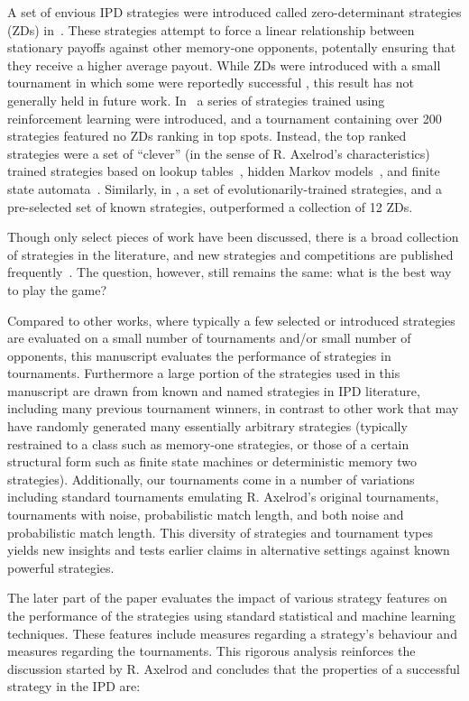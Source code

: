 \documentclass{article}
\newcommand{\numberofalltournaments}{}
\newcommand{\numberofstrategies}{}
\begin{document}
A set of envious IPD strategies were introduced called zero-determinant strategies (ZDs)
in~\cite{Press2012}. These strategies attempt to force a linear relationship between
stationary payoffs against other memory-one opponents, potentally ensuring that they
receive a higher average payout. While ZDs were introduced with a small tournament in
which some were reportedly successful \cite{Stewart2012}, this result has not generally
held in future work. In~\cite{Harper2017} a series of strategies trained using
reinforcement learning were introduced, and a tournament containing over 200 strategies
featured no ZDs ranking in top spots. Instead, the top ranked strategies
were a set of ``clever'' (in the sense of R. Axelrod's characteristics) trained
strategies based on lookup tables~\cite{Axelrod1987}, hidden Markov
models~\cite{Harper2017}, and finite state automata~\cite{Miller1996}.
Similarly, in \cite{mathieu2017}, a set of evolutionarily-trained strategies,
and a pre-selected set of known strategies, outperformed a collection of 12 ZDs.

Though only select pieces of work have been discussed, there is a broad collection
of strategies in the literature, and new strategies and competitions are
published frequently~\cite{Glynatsi2019}. The question, however, still remains
the same: what is the best way to play the game?

Compared to other works, where typically a few selected or introduced strategies
are evaluated on a small number of tournaments and/or small number of opponents,
this manuscript evaluates the performance of \numberofstrategies
strategies in \numberofalltournaments tournaments. Furthermore a large portion
of the strategies used in this manuscript are drawn from known and named strategies
in IPD literature, including many previous tournament winners,
in contrast to other work that may have randomly generated many essentially arbitrary
strategies (typically restrained to a class such as memory-one strategies,
or those of a certain structural form such as finite state machines or deterministic
memory two strategies). Additionally, our tournaments come in a
number of variations including standard tournaments emulating R. Axelrod's original tournaments,
tournaments with noise, probabilistic match length, and both noise and probabilistic match length.
This diversity of strategies and tournament types yields new insights and tests
earlier claims in alternative settings against known powerful strategies.

The later part of the paper evaluates the impact of various strategy features
on the performance of the strategies using standard statistical and machine learning techniques. These
features include measures regarding a strategy's behaviour and measures regarding
the tournaments. This rigorous analysis reinforces the discussion started by R. Axelrod
and concludes that the properties of a successful strategy in the IPD are:
\end{document}
